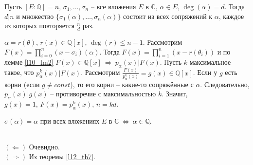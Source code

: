 \begin{theorem} \label{l12_th7}
	Пусть $[E \colon \mathbb{Q}] = n, \, \sigma_1,\dots,\sigma_n$ -- все вложения $E$ в $\mathbb{C}, \, \alpha \in E, \, \deg(\alpha) = d$. Тогда $d \vert n$ и множество $\{ \sigma_1(\alpha),\dots,\sigma_n(\alpha) \}$ состоит из всех сопряжений к $\alpha$, каждое из которых повторяется $\displaystyle \frac{n}{d}$ раз.
\end{theorem}
\begin{pf}
	$\alpha = r(\theta), \, r(x) \in \mathbb{Q}[x], \, \deg(r) \leq n-1$.
	Рассмотрим $\displaystyle F(x) = \prod\limits_{i=0}^n (x-\sigma_i)(\alpha)$. Тогда $\displaystyle F(x) = \prod\limits_{i=1}^n (x-r(\theta_i))$ и по лемме \ref{l10_lm2} $F(x) \in \mathbb{Q}[x] \ \Rightarrow \ p_\alpha(x) \vert F(x)$.
	Пусть $k$ максимальное такое, что $p_\alpha^k(x) \vert F(x)$. Рассмотрим $\displaystyle \frac{F(x)}{p_\alpha^k(x)} = g(x) \in \mathbb{Q}[x]$.
	Если у $g$ есть корни (если $g \not\equiv const$), то его корни -- какие-то сопряжённые с $\alpha$. Следовательно, $p_\alpha(x) \vert g(x)$ -- противоречие с максимальностью $k$.
	Значит, $g(x)=1,\,F(x)=p_\alpha^k(x),\,n=kd$.
\end{pf}

\begin{corollary}
	$\sigma(\alpha) = \alpha$ при всех вложениях $E$ в $\mathbb{C} \ \Leftrightarrow \ \alpha \in \mathbb{Q}$.
\end{corollary}
\begin{pf}~\\
	$(\Leftarrow)$ Очевидно.\\
	$(\Rightarrow)$ Из теоремы \ref{l12_th7}.
\end{pf}